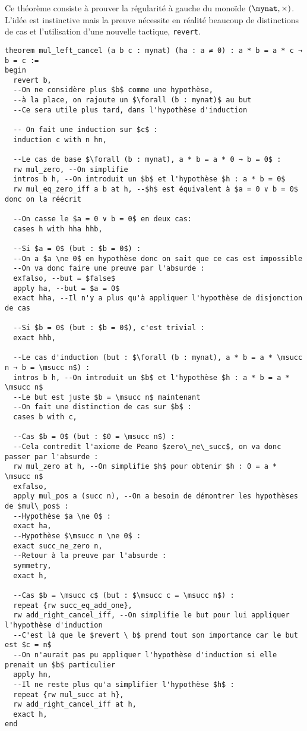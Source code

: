 Ce théorème consiste à prouver la régularité à gauche du monoïde $(\mynat, \times)$.
L'idée est instinctive mais la preuve nécessite en réalité beaucoup de distinctions de cas et l'utilisation d'une nouvelle tactique, \texttt{revert}.
\begin{verbatim}
theorem mul_left_cancel (a b c : mynat) (ha : a ≠ 0) : a * b = a * c → b = c :=
begin
  revert b,
  --On ne considère plus $b$ comme une hypothèse,
  --à la place, on rajoute un $\forall (b : mynat)$ au but
  --Ce sera utile plus tard, dans l'hypothèse d'induction
  
  -- On fait une induction sur $c$ :
  induction c with n hn,

  --Le cas de base $\forall (b : mynat), a * b = a * 0 → b = 0$ :
  rw mul_zero, --On simplifie
  intros b h, --On introduit un $b$ et l'hypothèse $h : a * b = 0$
  rw mul_eq_zero_iff a b at h, --$h$ est équivalent à $a = 0 ∨ b = 0$ donc on la réécrit
  
  --On casse le $a = 0 ∨ b = 0$ en deux cas:
  cases h with hha hhb,
  
  --Si $a = 0$ (but : $b = 0$) :
  --On a $a \ne 0$ en hypothèse donc on sait que ce cas est impossible
  --On va donc faire une preuve par l'absurde :
  exfalso, --but = $false$
  apply ha, --but = $a = 0$
  exact hha, --Il n'y a plus qu'à appliquer l'hypothèse de disjonction de cas
  
  --Si $b = 0$ (but : $b = 0$), c'est trivial :
  exact hhb,

  --Le cas d'induction (but : $\forall (b : mynat), a * b = a * \msucc n → b = \msucc n$) :
  intros b h, --On introduit un $b$ et l'hypothèse $h : a * b = a * \msucc n$
  --Le but est juste $b = \msucc n$ maintenant
  --On fait une distinction de cas sur $b$ :
  cases b with c,

  --Cas $b = 0$ (but : $0 = \msucc n$) :
  --Cela contredit l'axiome de Peano $zero\_ne\_succ$, on va donc passer par l'absurde :
  rw mul_zero at h, --On simplifie $h$ pour obtenir $h : 0 = a * \msucc n$
  exfalso,
  apply mul_pos a (succ n), --On a besoin de démontrer les hypothèses de $mul\_pos$ :
  --Hypothèse $a \ne 0$ :
  exact ha,
  --Hypothèse $\msucc n \ne 0$ :
  exact succ_ne_zero n,
  --Retour à la preuve par l'absurde :
  symmetry,
  exact h,

  --Cas $b = \msucc c$ (but : $\msucc c = \msucc n$) :
  repeat {rw succ_eq_add_one},
  rw add_right_cancel_iff, --On simplifie le but pour lui appliquer l'hypothèse d'induction
  --C'est là que le $revert \ b$ prend tout son importance car le but est $c = n$
  --On n'aurait pas pu appliquer l'hypothèse d'induction si elle prenait un $b$ particulier
  apply hn,
  --Il ne reste plus qu'a simplifier l'hypothèse $h$ :
  repeat {rw mul_succ at h},
  rw add_right_cancel_iff at h,
  exact h,
end
\end{verbatim}

